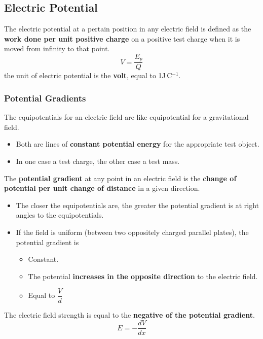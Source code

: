 \subsection{Electric Potential}

The electric potential at a pertain position in any electric field is defined as the \textbf{work done per unit positive charge} on  a positive test charge when it is moved from infinity to that point.
$$V=\frac{E_p}{Q}$$
the unit of electric potential is the \textbf{volt}, equal to 1J\,C$^{-1}$.

\subsubsection*{Potential Gradients}

The equipotentials for an electric field are like equipotential for a gravitational field.
\begin{itemize}
    \item Both are lines of \textbf{constant potential energy} for the appropriate test object.
    \item In one case a test charge, the other case a test mass.
\end{itemize}

The \textbf{potential gradient} at any point in an electric field is the \textbf{change of potential per unit change of distance} in a given direction.
\begin{itemize}
    \item The closer the equipotentials are, the greater the potential gradient is at right angles to the equipotentials.
    \item If the field is uniform (between two oppositely charged parallel plates), the potential gradient is
        \begin{itemize}
            \item Constant.
            \item The potential \textbf{increases in the opposite direction} to the electric field.
            \item Equal to $\dfrac{V}{d}$
        \end{itemize}
\end{itemize}

The electric field strength is equal to the \textbf{negative of the potential gradient}.
$$E=-\frac{dV}{dx}$$

